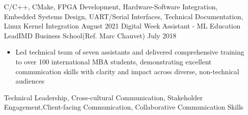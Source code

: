\begin{experiences}
                    {C/C++, CMake, FPGA Development, Hardware-Software Integration, Embedded Systems Design, UART/Serial Interfaces, Technical Documentation, Linux Kernel Integration}
  \emptySeparator
\experience
    {August 2021}   {Digital Week Assistant - ML Education Lead}{IMD Business School}{(Ref. Marc Chauvet)}
    {July 2018} {
                      \begin{itemize}
                        \item Led technical team of seven assistants and delivered comprehensive training to over 100 international MBA students, demonstrating excellent communication skills with clarity and impact across diverse, non-technical audiences
                      \end{itemize}
                    }
                    {Technical Leadership, Cross-cultural Communication, Stakeholder Engagement,Client-facing Communication, Collaborative Communication Skills}
  \emptySeparator
\end{experiences}
